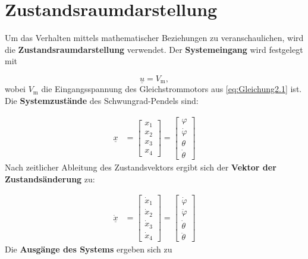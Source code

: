 \pagestyle{aaron}
\section{Zustandsraumdarstellung} \label{sec:Zustandsraumdarstellung}

Um das Verhalten mittels mathematischer Beziehungen zu veranschaulichen, wird die \textbf{Zustandsraumdarstellung} verwendet. Der \textbf{Systemeingang} wird festgelegt mit

\begin{equation} \label{eq:Gleichung3.1}
    \underline{u} = V_{\mathrm{m}},
\end{equation}
\newline
wobei $V_{\mathrm{m}}$ die Eingangsspannung des Gleichstrommotors aus \autoref{eq:Gleichung2.1} ist. Die \textbf{Systemzustände} des Schwungrad-Pendels sind:

\begin{align}
    \underline{x} &=
    \begin{bmatrix} \label{eq:Gleichung3.2}
        x_{\mathrm{1}} \\
        x_{\mathrm{2}} \\
        x_{\mathrm{3}} \\
        x_{\mathrm{4}}
    \end{bmatrix} =
    \begin{bmatrix}
        \varphi     \\
        \dot\varphi \\
        \theta      \\
        \dot\theta
    \end{bmatrix}
\end{align}
\newline
Nach zeitlicher Ableitung des Zustandsvektors ergibt sich der \textbf{Vektor der Zustandsänderung} zu:

\begin{align}
    \underline{\dot{x}} &=
    \begin{bmatrix} \label{eq:Gleichung3.3}
        \dot x_{\mathrm{1}} \\
        \dot x_{\mathrm{2}} \\
        \dot x_{\mathrm{3}} \\
        \dot x_{\mathrm{4}}
    \end{bmatrix} =
    \begin{bmatrix}
        \dot\varphi     \\
        \ddot\varphi    \\
        \dot\theta      \\
        \ddot\theta
    \end{bmatrix}
\end{align}
\newline
Die \textbf{Ausgänge des Systems} ergeben sich zu

